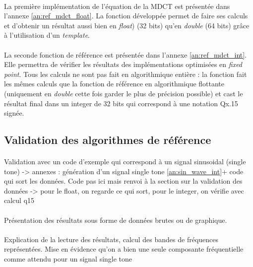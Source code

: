 \documentclass{article}
\begin{document}
    \paragraph{}
    La première implémentation de l'équation de la MDCT est présentée dans l'annexe \ref{an:ref_mdct_float}. La fonction développée permet de faire ses calculs et d'obtenir un résultat aussi bien en \emph{float}) (32 bits) qu'en \emph{double} (64 bits) grâce à l'utilisation d'un \emph{template}.

    \paragraph{}
    La seconde fonction de référence est présentée dans l'annexe \ref{an:ref_mdct_int}. Elle permettra de vérifier les résultats des implémentations optimisées en \emph{fixed point}. Tous les calculs ne sont pas fait en algorithmique entière : la fonction fait les mêmes calculs que la fonction de référence en algorithmique flottante (uniquement en \emph{double} cette fois garder le plus de précision possible) et cast le résultat final dans un integer de 32 bits qui correspond à une notation Qx.15 signée.

    \subsection{Validation des algorithmes de référence}

    \paragraph{}%
    Validation avec un code d'exemple qui correspond à un signal sinusoidal (single tone) -> annexes : génération d'un signal single tone \ref{an:sin_wave_int}+ code qui sort les données. Code pas ici mais renvoi à la section sur la validation des données -> pour le float, on regarde ce qui sort, pour le integer, on vérifie avec calcul q15


    \paragraph{}%
    Présentation des résultats sous forme de données brutes ou de graphique.

    \paragraph{}%
    Explication de la lecture des résultats, calcul des bandes de fréquences représentées. Mise en évidence qu'on a bien une seule composante fréquentielle comme attendu pour un signal single tone
\end{document}
